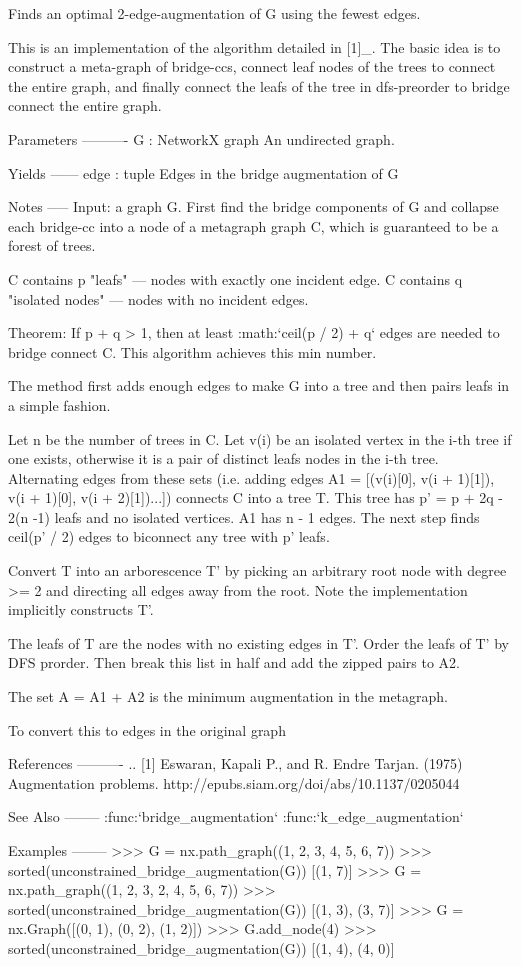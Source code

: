 \begin{DoxyVerb}Finds an optimal 2-edge-augmentation of G using the fewest edges.

This is an implementation of the algorithm detailed in [1]_.
The basic idea is to construct a meta-graph of bridge-ccs, connect leaf
nodes of the trees to connect the entire graph, and finally connect the
leafs of the tree in dfs-preorder to bridge connect the entire graph.

Parameters
----------
G : NetworkX graph
   An undirected graph.

Yields
------
edge : tuple
    Edges in the bridge augmentation of G

Notes
-----
Input: a graph G.
First find the bridge components of G and collapse each bridge-cc into a
node of a metagraph graph C, which is guaranteed to be a forest of trees.

C contains p "leafs" --- nodes with exactly one incident edge.
C contains q "isolated nodes" --- nodes with no incident edges.

Theorem: If p + q > 1, then at least :math:`ceil(p / 2) + q` edges are
    needed to bridge connect C. This algorithm achieves this min number.

The method first adds enough edges to make G into a tree and then pairs
leafs in a simple fashion.

Let n be the number of trees in C. Let v(i) be an isolated vertex in the
i-th tree if one exists, otherwise it is a pair of distinct leafs nodes
in the i-th tree. Alternating edges from these sets (i.e.  adding edges
A1 = [(v(i)[0], v(i + 1)[1]), v(i + 1)[0], v(i + 2)[1])...]) connects C
into a tree T. This tree has p' = p + 2q - 2(n -1) leafs and no isolated
vertices. A1 has n - 1 edges. The next step finds ceil(p' / 2) edges to
biconnect any tree with p' leafs.

Convert T into an arborescence T' by picking an arbitrary root node with
degree >= 2 and directing all edges away from the root. Note the
implementation implicitly constructs T'.

The leafs of T are the nodes with no existing edges in T'.
Order the leafs of T' by DFS prorder. Then break this list in half
and add the zipped pairs to A2.

The set A = A1 + A2 is the minimum augmentation in the metagraph.

To convert this to edges in the original graph

References
----------
.. [1] Eswaran, Kapali P., and R. Endre Tarjan. (1975) Augmentation problems.
    http://epubs.siam.org/doi/abs/10.1137/0205044

See Also
--------
:func:`bridge_augmentation`
:func:`k_edge_augmentation`

Examples
--------
>>> G = nx.path_graph((1, 2, 3, 4, 5, 6, 7))
>>> sorted(unconstrained_bridge_augmentation(G))
[(1, 7)]
>>> G = nx.path_graph((1, 2, 3, 2, 4, 5, 6, 7))
>>> sorted(unconstrained_bridge_augmentation(G))
[(1, 3), (3, 7)]
>>> G = nx.Graph([(0, 1), (0, 2), (1, 2)])
>>> G.add_node(4)
>>> sorted(unconstrained_bridge_augmentation(G))
[(1, 4), (4, 0)]
\end{DoxyVerb}
